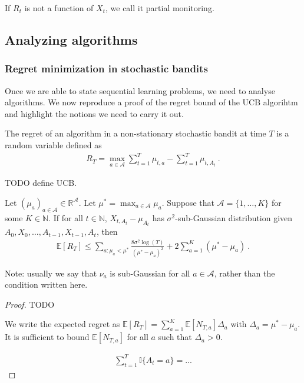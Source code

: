If $R_t$ is not a function of $X_t$, we call it partial monitoring.

\subsection{Analyzing algorithms}
\label{sub:analyzing_algorithms}

\subsubsection{Regret minimization in stochastic bandits}
\label{subs:regret_minimization_in_stochastic_bandits}

Once we are able to state sequential learning problems, we need to analyse algorithms. We now reproduce a proof of the regret bound of the UCB algorihtm and highlight the notions we need to carry it out.

\begin{definition}
The regret of an algorithm in a non-stationary stochastic bandit at time $T$ is a random variable defined as
\begin{align*}
R_T = \max_{a \in \mathcal A} \sum_{t=1}^T \mu_{t, a} - \sum_{t=1}^T \mu_{t, A_t} \: .
\end{align*}
\end{definition}

TODO define UCB.

\begin{theorem}
Let $(\mu_a)_{a \in \mathcal A} \in \mathbb{R}^{\mathcal A}$. Let $\mu^* = \max_{a \in \mathcal A} \mu_a$. Suppose that $\mathcal A = \{1, \ldots, K\}$ for some $K \in \mathbb{N}$. If for all $t \in \mathbb{N}$, $X_{t,A_t} - \mu_{A_t}$ has $\sigma^2$-sub-Gaussian distribution given $A_0, X_0, \ldots, A_{t-1}, X_{t-1}, A_t$, then
\begin{align*}
\mathbb{E}[R_T] \le \sum_{a: \mu_a < \mu^*} \frac{8 \sigma^2 \log(T)}{(\mu^* - \mu_a)^2} + 2\sum_{a = 1}^K (\mu^* - \mu_a) \: .
\end{align*}
\end{theorem}
Note: usually we say that $\nu_a$ is sub-Gaussian for all $a \in \mathcal A$, rather than the condition written here.

\begin{proof}

TODO

We write the expected regret as $\mathbb{E}[R_T] = \sum_{a=1}^K \mathbb{E}[N_{T,a}] \Delta_a$ with $\Delta_a = \mu^* - \mu_a$. It is sufficient to bound $\mathbb{E}[N_{T,a}]$ for all $a$ such that $\Delta_a > 0$.

\begin{align*}
\sum_{t=1}^T \mathbb{I}\{A_t = a\} = ...
\end{align*}


\end{proof}


